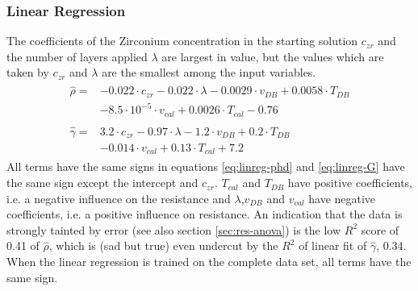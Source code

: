 \subsubsection{Linear Regression} 
The coefficients of
the Zirconium concentration in the starting solution $c_{zr}$ and the number of layers applied $\lambda$ are largest in value, but the values which are taken by $c_{zr}$ and $\lambda$ are the smallest among the input variables. 
%
\begin{align}
	\begin{split}
		\label{eq:linreg-phd}
		\hat{\rho} =&  -0.022\cdot c_{zr} -0.022\cdot \lambda -0.0029\cdot v_{DB} + 0.0058\cdot T_{DB} \\
		& -8.5\cdot 10^{-5}\cdot v_{cal} + 0.0026\cdot T_{cal} -0.76
	\end{split}
	\\
	\begin{split}
		\label{eq:linreg-G}
		\hat{\gamma} ={} & 3.2\cdot c_{zr} - 0.97\cdot \lambda - 1.2\cdot v_{DB} + 0.2\cdot T_{DB} \\
			& - 0.014\cdot v_{cal} + 0.13\cdot T_{cal} + 7.2
	\end{split}
\end{align}
%
All terms have the same signs in equations \ref{eq:linreg-phd} and \ref{eq:linreg-G} have the same sign except the intercept and $c_{zr}$. 
$T_{cal}$ and $T_{DB}$ have positive coefficients, i.e. a negative influence on the resistance 
and $\lambda$,$v_{DB}$ and $v_{cal}$ have negative coefficients, i.e. a positive influence on resistance. 
An indication that the data is strongly tainted by error (see also section \ref{sec:res-anova}) is the low $R^2$ score of 0.41 of $\hat\rho$, 
which is (sad but true) even undercut by the $R^2$ of linear fit of $\hat\gamma$, 0.34. 
When the linear regression is trained on the complete data set, all terms have the same sign. 
